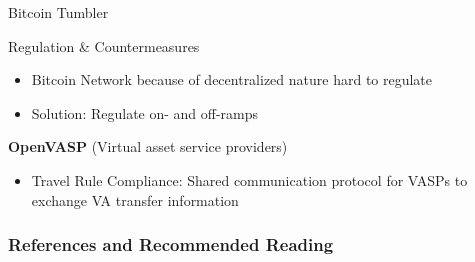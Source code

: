 \documentclass[]{beamer}
\begin{document}
\begin{frame}{Bitcoin Tumbler}

\end{frame}


\begin{frame}{Regulation \& Countermeasures}
\begin{itemize}
	\item Bitcoin Network because of decentralized nature hard to regulate
	\item Solution: Regulate on- and off-ramps
\end{itemize}
\vspace{1em}
\textbf{OpenVASP} (Virtual asset service providers)
\begin{itemize}
\item Travel Rule Compliance: Shared communication protocol for VASPs to exchange VA transfer information
\
\end{itemize}
\end{frame}

\begin{frame}%
\frametitle{References and Recommended Reading}
	
	
\end{frame}
\end{document}
